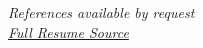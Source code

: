 \documentclass{resume/resume}
\begin{document}
%
%
%
%
\vspace{1.2em}
\begin{center}
    {\em References available by request} \\
    {\em \href{https://www.overleaf.com/read/dpkcngtfrygt}{Full Resume Source}}
\end{center}
\end{document}
